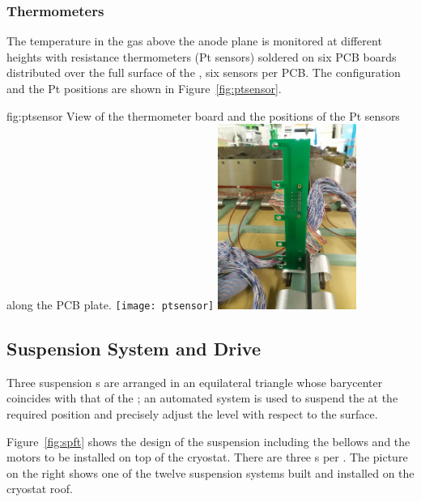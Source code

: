 \subsubsection{Thermometers}

The temperature in the gas above the anode plane is monitored at different heights with resistance thermometers (Pt sensors) soldered on  six PCB boards distributed over the full surface of the , six 
sensors per PCB. The configuration and the Pt positions are shown in Figure~\ref{fig:ptsensor}.

\begin{dunefigure}{fig:ptsensor}
{View of the thermometer board and the positions of the Pt sensors along the PCB plate.}
\texttt{[image: ptsensor]}
\includegraphics[width=0.34\textwidth]{graphics/ptsensor-crp}
\end{dunefigure}


\subsection{Suspension System and Drive}
\label{sec:fddp-crp-suspension}

Three suspension \fdth{}s are arranged in an equilateral triangle whose barycenter coincides with that of the ; an automated system is used to suspend the  at the required position and precisely adjust the  level with respect to the \lar surface.

Figure~\ref{fig:spft} shows the design of the suspension \fdth including the bellows and the motors to be installed on top of the cryostat. There are three \fdth{}s per . The picture on the right shows one of the twelve suspension systems built and installed on the  cryostat roof.

